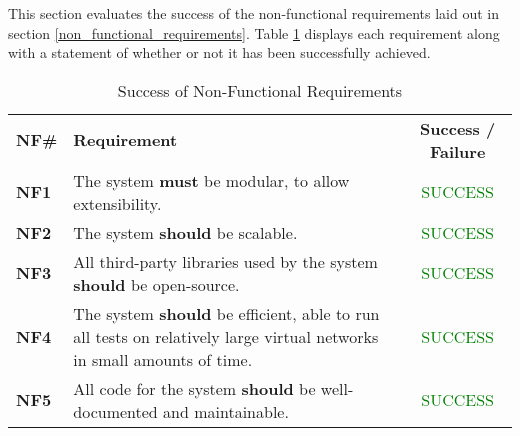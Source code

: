 
This section evaluates the success of the non-functional requirements laid out in section \ref{non_functional_requirements}. Table \ref{evaluation_non_functional_requirements_table} displays each requirement along with a statement of whether or not it has been successfully achieved.

\begin{center}
  \begin{longtable}{|l|p{9cm}|c|}
    \caption{Success of Non-Functional Requirements} \\ \hline
    \label{evaluation_non_functional_requirements_table}
    \textbf{NF\#} & \textbf{Requirement} & \textbf{Success / Failure} \\ \thickhline
    \textbf{NF1} & The system \textbf{must} be modular, to allow extensibility. & \textcolor{green}{SUCCESS} \\ \hline
    \textbf{NF2} & The system \textbf{should} be scalable. & \textcolor{green}{SUCCESS} \\ \hline
    \textbf{NF3} & All third-party libraries used by the system \textbf{should} be open-source. & \textcolor{green}{SUCCESS} \\ \hline
    \textbf{NF4} & The system \textbf{should} be efficient, able to run all tests on relatively large virtual networks in small amounts of time. & \textcolor{green}{SUCCESS} \\ \hline
    \textbf{NF5} & All code for the system \textbf{should} be well-documented and maintainable. & \textcolor{green}{SUCCESS} \\ \hline
  \end{longtable}
\end{center}
